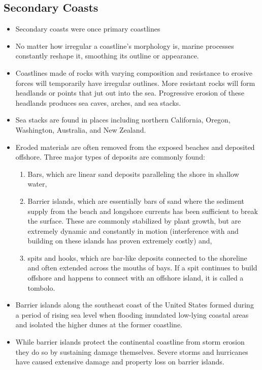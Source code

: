 \documentclass{article}
\begin{document}
	\subsection{Secondary Coasts}
	\begin{itemize}
		\item Secondary coasts were once primary coastlines
		\item No matter how irregular a coastline’s morphology is, marine processes constantly reshape it, smoothing its outline or appearance.
		\item Coastlines made of rocks with varying composition and resistance to erosive forces will temporarily have irregular outlines. More resistant rocks will form headlands or points that jut out into the sea. Progressive erosion of these headlands produces sea caves, arches, and sea stacks.
		\item Sea stacks are found in places including northern California, Oregon, Washington, Australia, and New Zealand.
		\item Eroded materials are often removed from the exposed beaches and deposited offshore. Three major types of deposits are commonly found:
		\begin{enumerate}
			\item Bars, which are linear sand deposits paralleling the shore in shallow water,
			\item Barrier islands, which are essentially bars of sand where the sediment supply from the beach and longshore currents has been sufficient to break the surface. These are commonly stabilized by plant growth, but are extremely dynamic and constantly in motion (interference with and building on these islands has proven extremely costly) and,
			\item spits and hooks, which are bar-like deposits connected to the shoreline and often extended across the mouths of bays.  If a spit continues to build offshore and happens to connect with an offshore island, it is called a tombolo.
		\end{enumerate}
		\item Barrier islands along the southeast coast of the United States formed during a period of rising sea level when flooding inundated low-lying coastal areas and isolated the higher dunes at the former coastline.
		\item While barrier islands protect the continental coastline from storm erosion they do so by sustaining damage  themselves.  Severe storms and hurricanes have caused extensive damage and property loss on barrier islands.

\end{itemize}
\end{document}
